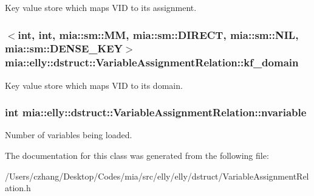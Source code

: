 Key value store which maps V\-I\-D to its assignment. \hypertarget{classmia_1_1elly_1_1dstruct_1_1_variable_assignment_relation_ad26195bd52815d772770a07d65d755f5}{
\subsubsection[{kf\-\_\-domain}]{$<$int, int, mia\-::sm\-::\-M\-M, mia\-::sm\-::\-D\-I\-R\-E\-C\-T, mia\-::sm\-::\-N\-I\-L, mia\-::sm\-::\-D\-E\-N\-S\-E\-\_\-\-K\-E\-Y$>$ mia\-::elly\-::dstruct\-::\-Variable\-Assignment\-Relation\-::kf\-\_\-domain}}\label{classmia_1_1elly_1_1dstruct_1_1_variable_assignment_relation_ad26195bd52815d772770a07d65d755f5}
Key value store which maps V\-I\-D to its domain. \hypertarget{classmia_1_1elly_1_1dstruct_1_1_variable_assignment_relation_ad2dca4f9ea916afc044726130e6f8312}{
\subsubsection[{nvariable}]{\setlength{\rightskip}{0pt plus 5cm}int mia\-::elly\-::dstruct\-::\-Variable\-Assignment\-Relation\-::nvariable}}\label{classmia_1_1elly_1_1dstruct_1_1_variable_assignment_relation_ad2dca4f9ea916afc044726130e6f8312}
Number of variables being loaded. 

The documentation for this class was generated from the following file\-:\begin{DoxyCompactItemize}
\item 
/\-Users/czhang/\-Desktop/\-Codes/mia/src/elly/elly/dstruct/Variable\-Assignment\-Relation.\-h\end{DoxyCompactItemize}
